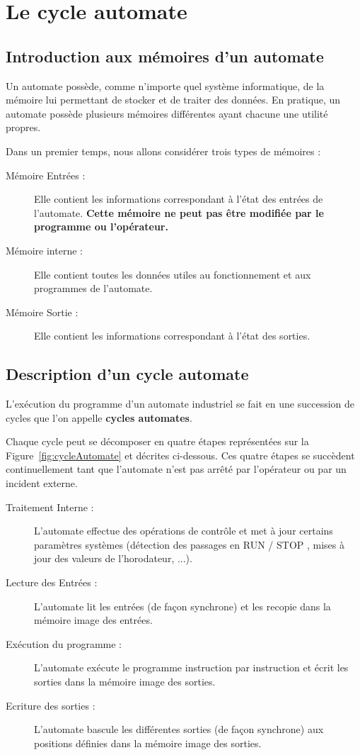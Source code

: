 
\section{Le cycle automate}
\subsection{Introduction aux mémoires d'un automate}
Un automate possède, comme n'importe quel système informatique, de la mémoire lui permettant de stocker et de traiter des données. En pratique, un automate possède plusieurs mémoires différentes ayant chacune une utilité propres.

Dans un premier temps, nous allons considérer trois types de mémoires :
\begin{description}
  \item [Mémoire Entrées : ] Elle contient les informations correspondant à l'état des entrées de l'automate. \textbf{\color{red} Cette mémoire ne peut pas être modifiée par le programme ou l'opérateur.}
  \item [Mémoire interne : ] Elle contient toutes les données utiles au fonctionnement et aux programmes de l'automate.
  \item [Mémoire Sortie : ] Elle contient les informations correspondant à l'état des sorties.
\end{description}
\subsection{Description d'un cycle automate}

L'exécution du programme d'un automate industriel se fait en une succession de cycles que l'on appelle \textbf{cycles automates}.

Chaque cycle peut se décomposer en quatre étapes représentées sur la Figure~\ref{fig:cycleAutomate} et décrites ci-dessous. Ces quatre étapes se succèdent continuellement tant que l'automate n'est pas arrêté par l'opérateur ou par un incident externe.
\begin{description}
  \item[Traitement Interne : ] L'automate effectue des opérations de contrôle et met à jour certains paramètres systèmes (détection des passages en RUN / STOP , mises à jour des valeurs de l'horodateur, ...).
  \item[Lecture des Entrées : ]  L'automate lit les entrées (de façon synchrone) et les recopie dans la mémoire image des entrées.
  \item[Exécution du programme : ] L'automate exécute le programme instruction par instruction et écrit les sorties dans la mémoire image des sorties.
  \item[Ecriture des sorties : ] L'automate bascule les différentes sorties (de façon synchrone) aux positions définies dans la mémoire image des sorties.
\end{description}

